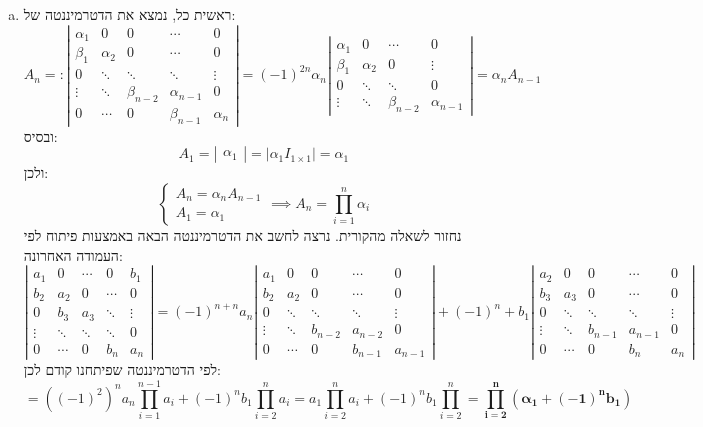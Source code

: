 \documentclass[]{article}
\newcommand\detms[1]   {\sof{\begin{matrix}
            #1
\end{matrix}}}
\newcommand\ag        {\alpha}
\newcommand\bg        {\beta}
\newcommand\sof[1]    {\left | #1 \right |}
\newcommand\cl [1]    {\left ( #1 \right )}
\newcommand\dequad    {\!\!\!\!\!\!}
\theoremstyle{definition}
\begin{document}
    \begin{enumerate}[(a)]
        \item ראשית כל, נמצא את הדטרמיננטה של: 
        \[ A_n =: \detms{\ag_1 & 0 & 0 & \cdots & 0 \\ \bg_1 & \ag_2 & 0 & \cdots & 0 \\ 0 & \ddots & \ddots & \ddots & \vdots \\ \vdots & \ddots & \bg_{n - 2} & \ag_{n - 1} & 0 \\ 0 & \cdots & 0 & \bg_{n - 1} & \ag_n}
        = (-1)^{2n}\ag_n \detms{\ag_1 & 0 & \cdots & 0 \\ \bg_1 & \ag_2 & 0 & \vdots \\ 0 & \ddots & \ddots & 0 \\ \vdots & \ddots & \bg_{n - 2} & \ag_{n - 1}} = \ag_n A_{n - 1} \]
        ובסיס: 
        \[ A_1 = \detms{\ag_1} = \sof{\ag_1 I_{1 \times 1}} = \ag_1 \]
        ולכן: 
        \[ \begin{cases}
            A_n = \ag_n A_{n - 1} \\
            A_1 = \ag_1
        \end{cases} \dequad\implies A_n = \prod_{i = 1}^{n}\ag_i \]
        נחזור לשאלה מהקורית. נרצה לחשב את הדטרמיננטה הבאה באמצעות פיתוח לפי העמודה האחרונה: 
        \[ \detms{a_1 & 0 & \cdots & 0 & b_1 \\ b_2 & a_2 & 0 & \cdots & 0 \\ 0 & b_3 & a_3 & \ddots & \vdots \\ \vdots & \ddots & \ddots & \ddots & 0 \\ 0& \cdots & 0& b_n & a_n} = (-1)^{n + n}a_n\detms{a_1 & 0 & 0 & \cdots & 0 \\ b_2 & a_2 & 0 & \cdots & 0 \\ 0 & \ddots & \ddots & \ddots & \vdots \\ \vdots & \ddots & b_{n - 2} & a_{n - 2} & 0 \\ 0 & \cdots & 0 & b_{n - 1} & a_{n - 1}} + (-1)^{n}
        + b_1\detms{a_2 & 0 & 0 & \cdots & 0 \\ b_3 & a_3 & 0 & \cdots & 0 \\ 0 & \ddots & \ddots & \ddots & \vdots \\ \vdots & \ddots & b_{n - 1} & a_{n - 1} & 0 \\ 0 & \cdots & 0 & b_{n} & a_n} \]
        לפי הדטרמיננטה שפיתחנו קודם לכן: 
        \[ = ((-1)^{2})^{n}a_n \prod_{i = 1}^{n - 1}a_{i} + (-1)^{n}b_1\prod_{i = 2}^{n}a_i = a_1\prod_{i = 2}^{n}a_i + (-1)^{n}b_1\prod_{i = 2}^{n} = \bm{\prod_{i = 2}^{n}\cl{\ag_1 + (-1)^{n}b_1}} \]
        

\end{enumerate}
\end{document}
